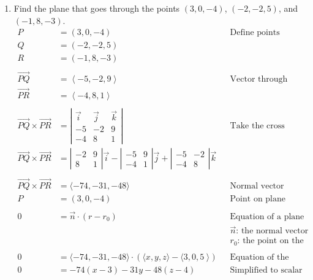 \documentclass{article}
\newenvironment{problem}[1]{
    \begin{enumerate}
        \item[\bfseries{#1}]
}
{
    \end{enumerate}
}
\begin{document}
\newpage
\begin{problem}{7}
    Find the plane that goes through the points $\left(3, 0, -4\right)$, $\left(-2, -2, 5\right)$, and $\left(-1, 8, -3\right)$.
    \begin{align*}
        P &= \left(3, 0, -4\right) && \text{Define points}\\
        Q &= \left(-2, -2, 5\right)\\
        R &= \left(-1, 8, -3\right)\\\\
        \overrightarrow{PQ} &= \left\langle -5, -2, 9 \right\rangle && \text{Vector through points}\\
        \overrightarrow{PR} &= \left\langle -4, 8, 1 \right\rangle\\\\
        \overrightarrow{PQ} \times \overrightarrow{PR} &= \left| {\begin{array}{*{20}{c}}{\vec i}&{\vec j}&{\vec k}\\{-5}&{-2}&{9}\\{-4}&{8}&{1}\end{array}} \right| && \text{Take the cross product}\\
        \overrightarrow{PQ} \times \overrightarrow{PR} &= \left| {\begin{array}{*{20}{c}}{-2}&{9}\\{8}&{1}\end{array}} \right|\vec i - \left| {\begin{array}{*{20}{c}}{-5}&{9}\\{-4}&{1}\end{array}} \right|\vec j + \left| {\begin{array}{*{20}{c}}{-5}&{-2}\\{-4}&{8}\end{array}} \right|\vec k\\\\
        \overrightarrow{PQ} \times \overrightarrow{PR} &= \langle -74, -31, -48 \rangle && \text{Normal vector}\\
        P &= \left(3, 0, -4\right) && \text{Point on plane}\\\\
        0 &= \vec{n}\cdot (r - r_0) && \text{Equation of a plane}\\
        &&&\text{$\vec n$: the normal vector}\\
        &&&\text{$r_0$: the point on the plane} \\\\
        0 &= \langle -74, -31, -48 \rangle \cdot \left(\langle x, y, z\rangle - \langle 3,0,5 \right\rangle) && \text{Equation of the plane}\\
        0 &= -74(x-3) - 31y - 48(z-4) && \text{Simplified to scalar notation}
    \end{align*}
\end{problem}
\end{document}
